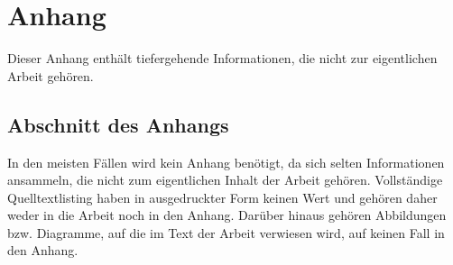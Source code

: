 
\chapter{Anhang}

Dieser Anhang enthält tiefergehende Informationen, die nicht zur eigentlichen Arbeit gehören.

\section{Abschnitt des Anhangs}

In den meisten Fällen wird kein Anhang benötigt, da sich selten Informationen ansammeln, die nicht zum eigentlichen Inhalt der Arbeit gehören. Vollständige Quelltextlisting haben in ausgedruckter Form keinen Wert und gehören daher weder in die Arbeit noch in den Anhang. Darüber hinaus gehören Abbildungen bzw. Diagramme, auf die im Text der Arbeit verwiesen wird, auf keinen Fall in den Anhang.